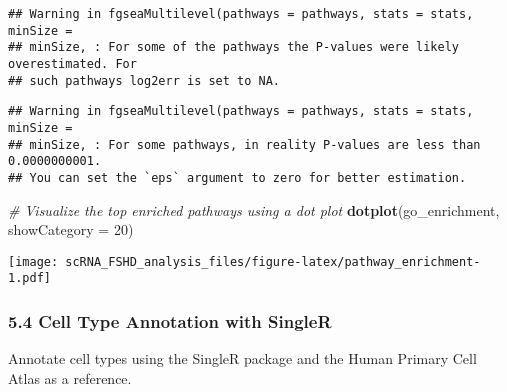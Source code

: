 \documentclass[
]{article}
\newenvironment{Shaded}{\begin{snugshade}}{\end{snugshade}}
\newcommand{\AttributeTok}[1]{\textcolor[rgb]{0.13,0.29,0.53}{#1}}
\newcommand{\CommentTok}[1]{\textcolor[rgb]{0.56,0.35,0.01}{\textit{#1}}}
\newcommand{\DecValTok}[1]{\textcolor[rgb]{0.00,0.00,0.81}{#1}}
\newcommand{\FunctionTok}[1]{\textcolor[rgb]{0.13,0.29,0.53}{\textbf{#1}}}
\newcommand{\NormalTok}[1]{#1}
\newcommand{\OtherTok}[1]{\textcolor[rgb]{0.56,0.35,0.01}{#1}}
\newcommand{\SpecialCharTok}[1]{\textcolor[rgb]{0.81,0.36,0.00}{\textbf{#1}}}
\newcommand{\StringTok}[1]{\textcolor[rgb]{0.31,0.60,0.02}{#1}}
\begin{document}
\begin{verbatim}
## Warning in fgseaMultilevel(pathways = pathways, stats = stats, minSize =
## minSize, : For some of the pathways the P-values were likely overestimated. For
## such pathways log2err is set to NA.
\end{verbatim}

\begin{verbatim}
## Warning in fgseaMultilevel(pathways = pathways, stats = stats, minSize =
## minSize, : For some pathways, in reality P-values are less than 0.0000000001.
## You can set the `eps` argument to zero for better estimation.
\end{verbatim}

\begin{Shaded}
\begin{Highlighting}[]
\CommentTok{\# Visualize the top enriched pathways using a dot plot}
\FunctionTok{dotplot}\NormalTok{(go\_enrichment, }\AttributeTok{showCategory =} \DecValTok{20}\NormalTok{)}
\end{Highlighting}
\end{Shaded}

\texttt{[image: scRNA\_FSHD\_analysis\_files/figure-latex/pathway\_enrichment-1.pdf]}

\subsubsection{5.4 Cell Type Annotation with
SingleR}\label{cell-type-annotation-with-singler}

Annotate cell types using the SingleR package and the Human Primary Cell
Atlas as a reference.

\begin{Shaded}
\end{Shaded}
\end{document}
